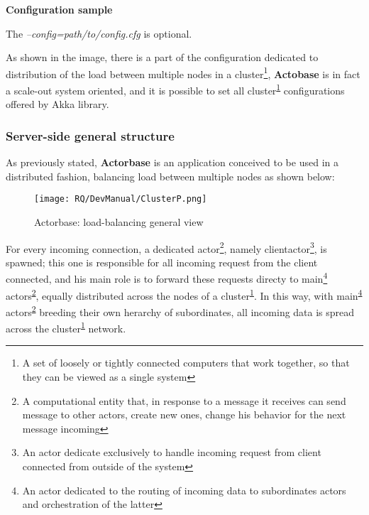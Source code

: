 \documentclass{scalatekids-article}
\begin{document}
\textbf{Configuration sample}


The \textit{--config=path/to/config.cfg} is optional.

As shown in the image, there is a part of the configuration dedicated to
distribution of the load between multiple nodes in a cluster\footnote{A set of
loosely or tightly connected computers that work together, so that they can be
viewed as a single system\label{cluster}}, \textbf{Actobase} is in fact a
scale-out system oriented, and it is possible to set all
cluster\textsuperscript{\ref{cluster}} configurations offered by Akka library.

\subsubsection{Server-side general structure}

As previously stated, \textbf{Actorbase} is an application conceived to be used in a distributed fashion,
balancing load between multiple nodes as shown below:

\begin{figure}[H]
  \begin{center}
    \texttt{[image: RQ/DevManual/ClusterP.png]}
    \caption{Actorbase: load-balancing general view}
  \end{center}
\end{figure}

For every incoming connection, a dedicated actor\footnote{A computational entity
that, in response to a message it receives can send message to other actors,
create new ones, change his behavior for the next message
incoming\label{actor}}, namely clientactor\footnote{An actor dedicate
exclusively to handle incoming request from client connected from outside of the
system}, is spawned; this one is responsible for all incoming request from the
client connected, and his main role is to forward these requests directy to
main\footnote{An actor dedicated to the routing of incoming data to subordinates
actors and orchestration of the latter\label{main}}
actors\textsuperscript{\ref{actor}}, equally distributed across the nodes of a
cluster\textsuperscript{\ref{cluster}}. In this way, with
main\textsuperscript{\ref{main}} actors\textsuperscript{\ref{actor}} breeding
their own herarchy of subordinates, all incoming data is spread across the
cluster\textsuperscript{\ref{cluster}} network.
\end{document}
